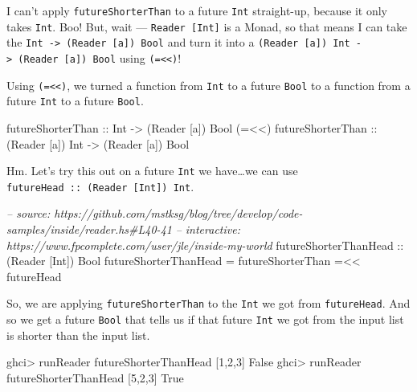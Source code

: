 \documentclass[]{article}
\newenvironment{Shaded}{}{}
\newcommand{\DataTypeTok}[1]{\textcolor[rgb]{0.56,0.13,0.00}{{#1}}}
\newcommand{\DecValTok}[1]{\textcolor[rgb]{0.25,0.63,0.44}{{#1}}}
\newcommand{\CommentTok}[1]{\textcolor[rgb]{0.38,0.63,0.69}{\textit{{#1}}}}
\newcommand{\OtherTok}[1]{\textcolor[rgb]{0.00,0.44,0.13}{{#1}}}
\newcommand{\FunctionTok}[1]{\textcolor[rgb]{0.02,0.16,0.49}{{#1}}}
\newcommand{\NormalTok}[1]{{#1}}
\begin{document}
I can't apply \texttt{futureShorterThan} to a future \texttt{Int} straight-up, because it only takes
\texttt{Int}. Boo! But, wait --- \texttt{Reader\ {[}Int{]}} is a Monad, so that means I can take the
\texttt{Int\ -\textgreater{}\ (Reader\ {[}a{]})\ Bool} and turn it into a
\texttt{(Reader\ {[}a{]})\ Int\ -\textgreater{}\ (Reader\ {[}a{]})\ Bool} using
\texttt{(=\textless{}\textless{})}!

Using \texttt{(=\textless{}\textless{})}, we turned a function from \texttt{Int} to a future
\texttt{Bool} to a function from a future \texttt{Int} to a future \texttt{Bool}.

\begin{Shaded}
\begin{Highlighting}[]
\OtherTok{futureShorterThan       ::} \DataTypeTok{Int}              \OtherTok{->} \NormalTok{(}\DataTypeTok{Reader} \NormalTok{[a]) }\DataTypeTok{Bool}
\NormalTok{(}\FunctionTok{=<<}\NormalTok{)}\OtherTok{ futureShorterThan ::} \NormalTok{(}\DataTypeTok{Reader} \NormalTok{[a]) }\DataTypeTok{Int} \OtherTok{->} \NormalTok{(}\DataTypeTok{Reader} \NormalTok{[a]) }\DataTypeTok{Bool}
\end{Highlighting}
\end{Shaded}

Hm. Let's try this out on a future \texttt{Int} we have\ldots{}we can use
\texttt{futureHead\ ::\ (Reader\ {[}Int{]})\ Int}.

\begin{Shaded}
\begin{Highlighting}[]
\CommentTok{-- source: https://github.com/mstksg/blog/tree/develop/code-samples/inside/reader.hs#L40-41}
\CommentTok{-- interactive: https://www.fpcomplete.com/user/jle/inside-my-world}
\OtherTok{futureShorterThanHead ::} \NormalTok{(}\DataTypeTok{Reader} \NormalTok{[}\DataTypeTok{Int}\NormalTok{]) }\DataTypeTok{Bool}
\NormalTok{futureShorterThanHead }\FunctionTok{=} \NormalTok{futureShorterThan }\FunctionTok{=<<} \NormalTok{futureHead}
\end{Highlighting}
\end{Shaded}

So, we are applying \texttt{futureShorterThan} to the \texttt{Int} we got from \texttt{futureHead}.
And so we get a future \texttt{Bool} that tells us if that future \texttt{Int} we got from the input
list is shorter than the input list.

\begin{Shaded}
\begin{Highlighting}[]
\NormalTok{ghci}\FunctionTok{>} \NormalTok{runReader futureShorterThanHead [}\DecValTok{1}\NormalTok{,}\DecValTok{2}\NormalTok{,}\DecValTok{3}\NormalTok{]}
\DataTypeTok{False}
\NormalTok{ghci}\FunctionTok{>} \NormalTok{runReader futureShorterThanHead [}\DecValTok{5}\NormalTok{,}\DecValTok{2}\NormalTok{,}\DecValTok{3}\NormalTok{]}
\DataTypeTok{True}
\end{Highlighting}
\end{Shaded}
\end{document}
